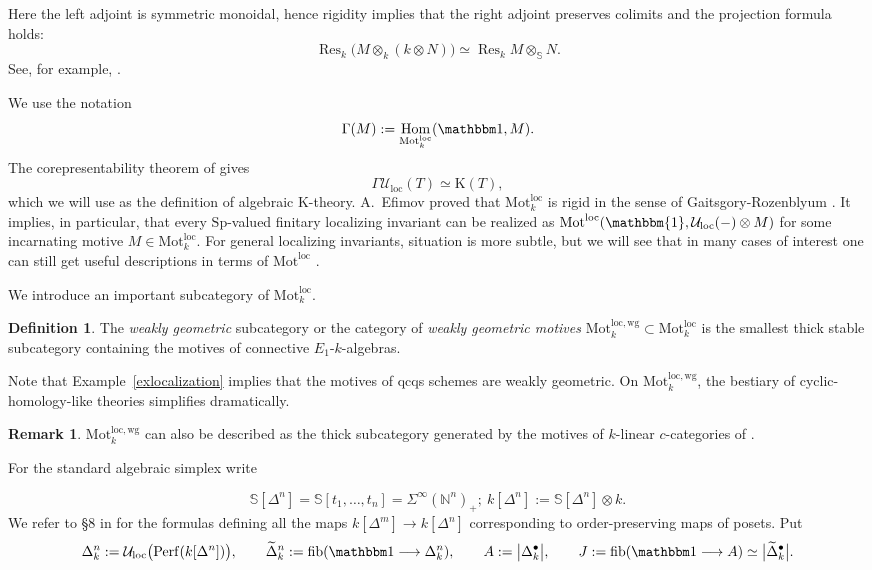 \documentclass{amsart}
\theoremstyle{plain}
\theoremstyle{definition}
\newtheorem{defi}[prop]{Definition}
\newtheorem{remark}[prop]{Remark}
\newcommand{\ra}{\rightarrow}
\newcommand{\bbN}{\mathbb{N}}
\newcommand{\bbS}{\mathbb{S}}
\newcommand{\Perf}{\mathrm{Perf}}
\newcommand{\Motloc}{\mathrm{Mot}^{\mathrm{loc}}}
\newcommand{\Motlocwg}{\mathrm{Mot}^{\mathrm{loc},\mathrm{wg}}}
\newcommand{\Uloc}{\mathcal U_{\mathrm{loc}}}
\newcommand{\fib}{\mathrm{fib}}
\newcommand{\K}{\mathrm{K}}
\newcommand{\Sp}{\mathrm{Sp}}
\DeclareMathOperator{\Hom}{Hom}
\DeclareMathOperator{\Res}{Res}
\begin{document}
Here the left adjoint is symmetric monoidal, hence rigidity implies that the right adjoint preserves colimits and the projection formula holds:
\[
\Res_k\bigl(M\otimes_k(k\otimes N)\bigr)
\simeq \Res_kM\otimes_\bbS N.
\]
See, for example,
\cite[Propositions 1.9(i) and 1.12(iv)]{Efi25a}.

We use the notation
\[
\Gamma(M):=\Hom_{\Motloc_k}(\mathbbm 1,M).
\]
The corepresentability theorem of \cite{BGT13} gives
\[
\Gamma\Uloc(T)\simeq \K(T),
\]
which we will use as the definition of algebraic K-theory.
A.~Efimov proved that $\Motloc_k$ is rigid in the sense of Gaitsgory-Rozenblyum \cite{Efi25b}.  It implies, in particular, that every $\Sp$-valued finitary localizing invariant can be realized as $\Motloc(\mathbbm{1}, \Uloc(-)\otimes M)$ for some incarnating motive $M\in\Motloc_k$. For general localizing invariants, situation is more subtle, but we will see that in many cases of interest one can still get useful descriptions in terms of $\Motloc$  .

We introduce an important subcategory of $\Motloc_k$.

\begin{defi}
The \emph{weakly geometric} subcategory or the category of \emph{weakly geometric motives}
$\Motlocwg_k\subset\Motloc_k$ is the smallest thick stable subcategory containing the motives of connective $E_1$-$k$-algebras.
\end{defi}

Note that Example~\ref{exlocalization} implies that the motives of qcqs schemes are weakly geometric.
 On $\Motlocwg_k$, the bestiary of cyclic-homology-like theories simplifies dramatically.

\begin{remark}\label{LevySosnilo}
    $\Motlocwg_k$ can also be described as the thick subcategory generated by the motives of $k$-linear $c$-categories of \cite{LS25}.
\end{remark}

\medskip

For the standard algebraic simplex write

\[
\bbS[\Delta^n]
 = \bbS[t_1,\ldots,t_n] = \Sigma^\infty(\bbN^n)_+; \ k[\Delta^n]:=\bbS[\Delta^n]\otimes k .
\]
We refer to §8 in \cite{Efi25b} for the formulas defining all the maps $k[\Delta^m] \ra k[\Delta^n]$ corresponding to order-preserving maps of posets. Put
\[
\Delta_k^n:=\Uloc\bigl(\Perf(k[\Delta^n])\bigr),
\qquad
\widetilde\Delta_k^n:=\fib(\mathbbm 1\longrightarrow\Delta_k^n),
\qquad
A:=\bigl|\Delta_k^\bullet\bigr|,
\qquad
J:=\fib(\mathbbm 1\longrightarrow A)\simeq\bigl|\widetilde\Delta_k^\bullet\bigr|.
\]
\end{document}
